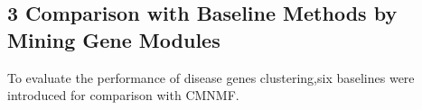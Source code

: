 \documentclass{bmcart}
\begin{document}
\subsection*{\textbf{3 Comparison with Baseline Methods by Mining Gene Modules}}
%
%
To evaluate the performance of disease genes clustering,six baselines were introduced for comparison with CMNMF.
\end{document}
